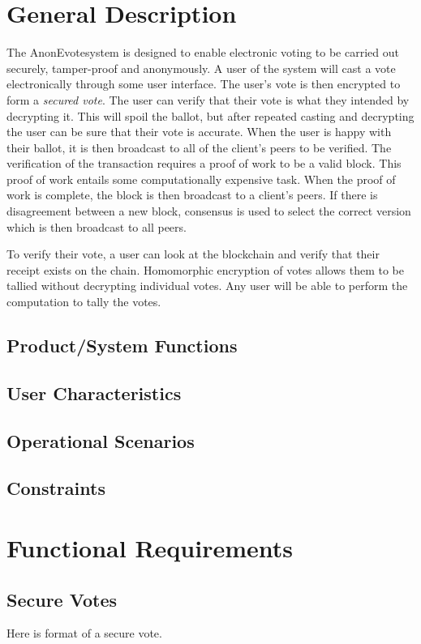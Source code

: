 \documentclass[a4paper,12pt]{article}
\newcommand{\proj}{AnonEvote}
\begin{document}
\section{General Description}
The \proj system is designed to enable electronic voting to be carried out securely, tamper-proof and anonymously. A user of the system will cast a vote electronically through some user interface. The user's vote is then encrypted to form a \textit{secured vote}. The user can verify that their vote is what they intended by decrypting it. This will spoil the ballot, but after repeated casting and decrypting the user can be sure that their vote is accurate. When the user is happy with their ballot, it is then broadcast to all of the client's peers to be verified. The verification of the transaction requires a proof of work to be a valid block. This proof of work entails some computationally expensive task. When the proof of work is complete, the block is then broadcast to a client's peers. If there is disagreement between a new block, consensus is used to select the correct version which is then broadcast to all peers.

To verify their vote, a user can look at the blockchain and verify that their receipt exists on the chain. Homomorphic encryption of votes allows them to be tallied without decrypting individual votes. Any user will be able to perform the computation to tally the votes.

\subsection{Product/System Functions}
\subsection{User Characteristics}
\subsection{Operational Scenarios}
\subsection{Constraints}

\section{Functional Requirements}
\subsection{Secure Votes}
\label{subsec:securevote}
Here is format of a secure vote.
\end{document}
